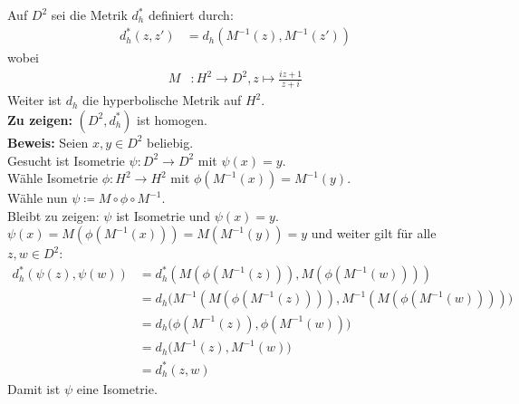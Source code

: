 \begin{problem*}[4]
  Auf \( D^2 \) sei die Metrik \( d_h^\ast \) definiert durch:
  \begin{align*}
    d_h^\ast (z, z') &= d_h(M^{-1}(z),M^{-1}(z')) 
  \end{align*}
  wobei
  \begin{align*} 
    M &: H^2 \to D^2, z \mapsto \frac{iz + 1}{z + i}
  \end{align*}
  Weiter ist \( d_h \) die hyperbolische Metrik auf \( H^2 \). \\
  \textbf{Zu zeigen:} \( (D^2, d_h^\ast) \) ist homogen. \\
  \textbf{Beweis:} Seien \( x,y \in D^2 \) beliebig. \\
  Gesucht ist Isometrie \( \psi: D^2 \to D^2 \) mit \( \psi(x) = y \). \\
  Wähle Isometrie \( \phi: H^2 \to H^2 \) mit \( \phi(M^{-1}(x)) = M^{-1}(y) \). \\
  Wähle nun \( \psi \coloneqq M \circ \phi \circ M^{-1} \). \\
  Bleibt zu zeigen: \( \psi \) ist Isometrie und \( \psi(x) = y \). \\
  \( \psi(x) = M(\phi(M^{-1}(x))) = M(M^{-1}(y)) = y \) und weiter gilt für alle \( z, w \in D^2 \):
  \begin{align*}
    d_h^\ast(\psi(z), \psi(w)) &= d_h^\ast (M(\phi(M^{-1}(z))), M(\phi(M^{-1}(w)))) \\
    &= d_h \big(M^{-1}(M(\phi(M^{-1}(z)))), M^{-1}(M(\phi(M^{-1}(w))))\big) \\
    &= d_h \big(\phi(M^{-1}(z)), \phi(M^{-1}(w))\big) \\
    &= d_h \big(M^{-1}(z), M^{-1}(w)) \\
    &= d_h^\ast (z, w)
  \end{align*}
  Damit ist \( \psi \) eine Isometrie.
\end{problem*}























